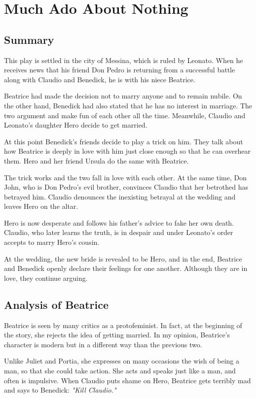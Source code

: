 \documentclass[]{article}
\begin{document}
\newpage
\section{Much Ado About Nothing}
\subsection*{Summary}
\hspace{1em}
This play is settled in the city of Messina, which is ruled by Leonato. When he receives news that his friend Don Pedro is returning from a successful battle along with Claudio and Benedick, he is with his niece Beatrice.

Beatrice had made the decision not to marry anyone and to remain nubile. On the other hand, Benedick had also stated that he has no interest in marriage. The two argument and make fun of each other all the time. Meanwhile, Claudio and Leonato's daughter Hero decide to get married.

At this point Benedick's friends decide to play a trick on him. They talk about how Beatrice is deeply in love with him just close enough so that he can overhear them. Hero and her friend Ursula do the same with Beatrice. 

The trick works and the two fall in love with each other. At the same time, Don John, who is Don Pedro's evil brother, convinces Claudio that her betrothed has betrayed him. Claudio denounces the inexisting betrayal at the wedding and leaves Hero on the altar.

Hero is now desperate and follows his father's advice to fake her own death. Claudio, who later learns the truth, is in despair and under Leonato's order accepts to marry Hero's cousin.

At the wedding, the new bride is revealed to be Hero, and in the end, Beatrice and Benedick openly declare their feelings for one another. Although they are in love, they continue arguing.

\subsection*{Analysis of Beatrice}
\hspace{1em}
Beatrice is seen by many critics as a protofeminist. In fact, at the beginning of the story, she rejects the idea of getting married. In my opinion, Beatrice's character is modern but in a different way than the previous two.

Unlike Juliet and Portia, she expresses on many occasions the wish of being a man, so that she could take action. She acts and speaks just like a man, and often is impulsive. When Claudio puts shame on Hero, Beatrice gets terribly mad and says to Benedick: \textit{"Kill Claudio."}
\end{document}
